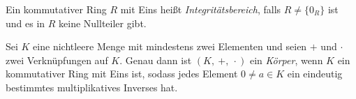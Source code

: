 \begin{defn} \label{Integritätsbereich}
Ein kommutativer Ring $R$ mit Eins heißt \textit{Integritätsbereich}, falls $R\neq \lbrace 0_R \rbrace$ ist und es in $R$ keine Nullteiler gibt.
\end{defn}
%
%
%
%
%
%
% 
%
%
% 
\begin{defn}
Sei $K$ eine nichtleere Menge mit mindestens zwei Elementen und seien $+$ und $\cdot$ zwei Verknüpfungen auf $K$. Genau dann ist $\left(K, ~+,~ \cdot\right)$ ein \textit{Körper}, wenn $K$ ein kommutativer Ring mit Eins ist, sodass jedes Element $0 \neq a\in K$ ein eindeutig bestimmtes multiplikatives Inverses hat.


 
\end{defn}


